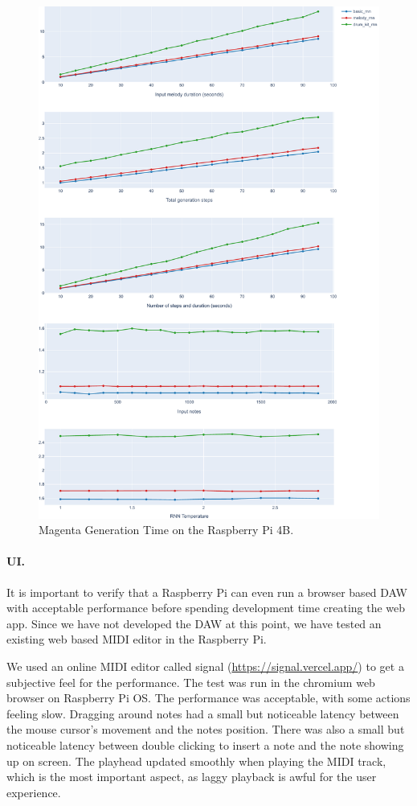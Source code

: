 \begin{figure}
  \centerline{ \includegraphics[width=.95\linewidth]{image/perf.pdf} }
  \caption{Magenta Generation Time on the Raspberry Pi 4B.}
  \label{fig:magentaperf}
\end{figure}

\paragraph{UI.} It is important to verify that a Raspberry Pi can even run a browser based
DAW with acceptable performance before spending development time creating the web app.
Since we have not developed the DAW at this point, we have tested an existing web based
MIDI editor in the Raspberry Pi.

We used an online MIDI editor called signal (\url{https://signal.vercel.app/}) to get a
subjective feel for the performance. The test was run in the chromium web browser on
Raspberry Pi OS. The performance was acceptable, with some actions feeling slow.
Dragging around notes had a small but noticeable latency between the mouse cursor's
movement and the notes position. There was also a small but noticeable latency between
double clicking to insert a note and the note showing up on screen. The playhead updated
smoothly when playing the MIDI track, which is the most important aspect, as laggy
playback is awful for the user experience.

